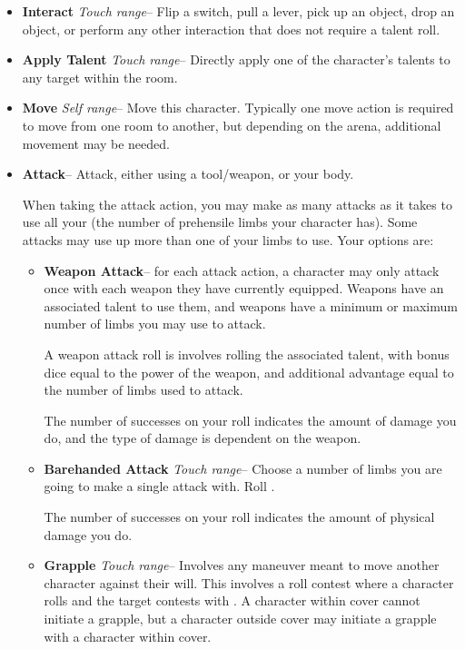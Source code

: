 \begin{GRPquicknotewide}
\begin{itemize}
	\item \textbf{Interact} \emph{Touch range}-- Flip a switch, pull a lever, pick up an object, drop an object, or perform any other interaction that does not require a talent roll.
	\item \textbf{Apply Talent} \emph{Touch range}-- Directly apply one of the character's talents to any target within the room.
	\item \textbf{Move} \emph{Self range}-- Move this character. Typically one move action is required to move from one room to another, but depending on the arena, additional movement may be needed.
	\item \textbf{Attack}-- Attack, either using a tool/weapon, or your body.

	When taking the attack action, you may make as many attacks as it takes to use all your  (the number of prehensile limbs your character has). Some attacks may use up more than one of your limbs to use. Your options are:
		\begin{itemize}
			\item \textbf{Weapon Attack}-- for each attack action, a character may only attack once with each weapon they have currently equipped. Weapons have an associated talent to use them, and weapons have a minimum or maximum number of limbs you may use to attack.

			A weapon attack roll is involves rolling the associated talent, with bonus dice equal to the power of the weapon, and additional advantage equal to the number of limbs used to attack.

			The number of successes on your roll indicates the amount of damage you do, and the type of damage is dependent on the weapon.

			\item \textbf{Barehanded Attack} \emph{Touch range}-- Choose a number of limbs you are going to make a single attack with. Roll .

			The number of successes on your roll indicates the amount of physical damage you do.

			\item \textbf{Grapple} \emph{Touch range}-- Involves any maneuver meant to move another character against their will. This involves a roll contest where a character rolls  and the target contests with . A character within cover cannot initiate a grapple, but a character outside cover may initiate a grapple with a character within cover.


\end{itemize}
\end{itemize}
\end{GRPquicknotewide}
